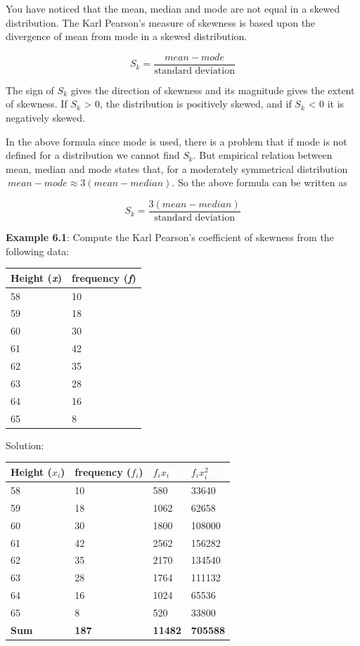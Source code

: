 \documentclass[
]{book}
\begin{document}
You have noticed that the mean, median and mode are not equal in a
skewed distribution. The Karl Pearson's measure of skewness is based
upon the divergence of mean from mode in a skewed distribution.

\[S_{k} = \frac{mean - mode}{\text{standard deviation}}\]

The sign of \(S_{k}\) gives the direction of skewness and its magnitude
gives the extent of skewness. If \(S_{k}\) \textgreater{} 0, the distribution is
positively skewed, and if \(S_{k}\) \textless{} 0 it is negatively skewed.

In the above formula since mode is used, there is a problem that if mode
is not defined for a distribution we cannot find \(S_{k}\). But empirical
relation between mean, median and mode states that, for a moderately
symmetrical distribution\(\ mean - mode \approx 3(mean - median)\). So the
above formula can be written as

\[S_{k} = \frac{3(mean - median)}{\text{standard deviation}}\]

\textbf{Example 6.1}: Compute the Karl Pearson's coefficient of skewness from
the following data:

\begin{longtable}[]{@{}ll@{}}
\toprule
Height (\emph{x}) & frequency (\emph{f}) \\
\midrule
\endhead
58 & 10 \\
59 & 18 \\
60 & 30 \\
61 & 42 \\
62 & 35 \\
63 & 28 \\
64 & 16 \\
65 & 8 \\
\bottomrule
\end{longtable}

Solution:

\begin{longtable}[]{@{}llll@{}}
\toprule
Height (\(x_{i}\)) & frequency (\(f_{i}\)) & \(f_{i}x_{i}\) & \(f_{i}x_{i}^{2}\) \\
\midrule
\endhead
58 & 10 & 580 & 33640 \\
59 & 18 & 1062 & 62658 \\
60 & 30 & 1800 & 108000 \\
61 & 42 & 2562 & 156282 \\
62 & 35 & 2170 & 134540 \\
63 & 28 & 1764 & 111132 \\
64 & 16 & 1024 & 65536 \\
65 & 8 & 520 & 33800 \\
\textbf{Sum} & \textbf{187} & \textbf{11482} & \textbf{705588} \\
\bottomrule
\end{longtable}
\end{document}
